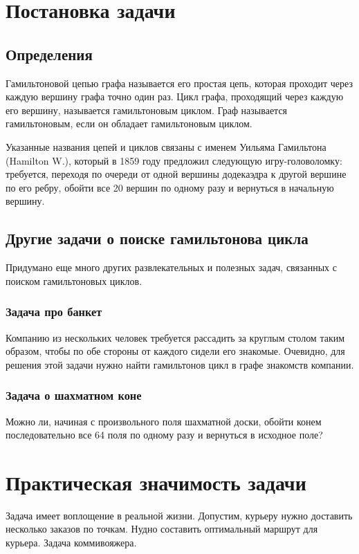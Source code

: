 





\tableofcontents
\newpage

\section{Постановка задачи}

\subsection{Определения}
Гамильтоновой цепью графа называется его простая цепь, которая проходит через каждую вершину графа точно один раз.
Цикл графа, проходящий через каждую его вершину, называется гамильтоновым циклом.
Граф называется гамильтоновым, если он обладает гамильтоновым циклом.

Указанные названия цепей и циклов связаны с именем Уильяма Гамильтона (Hamilton W.), который в 1859 году предложил следующую игру-головоломку:
требуется, переходя по очереди от одной вершины додекаэдра к другой вершине по его ребру, обойти все 20 вершин по одному разу и вернуться в начальную вершину.

\subsection{Другие задачи о поиске гамильтонова цикла}
Придумано еще много других развлекательных и полезных задач, связанных с поиском гамильтоновых циклов.

\subsubsection{Задача про банкет}
Компанию из нескольких человек требуется рассадить за круглым столом таким образом, чтобы по обе стороны от каждого сидели его знакомые.
Очевидно, для решения этой задачи нужно найти гамильтонов цикл в графе знакомств компании.

\subsubsection{Задача о шахматном коне}
Можно ли, начиная с произвольного поля шахматной доски, обойти конем последовательно все 64 поля по одному разу и вернуться в исходное поле?


\section{Практическая значимость задачи}
Задача имеет воплощение в реальной жизни. Допустим, курьеру нужно доставить несколько заказов по точкам.
Нудно составить оптимальный маршрут для курьера.
Задача коммивояжера.


